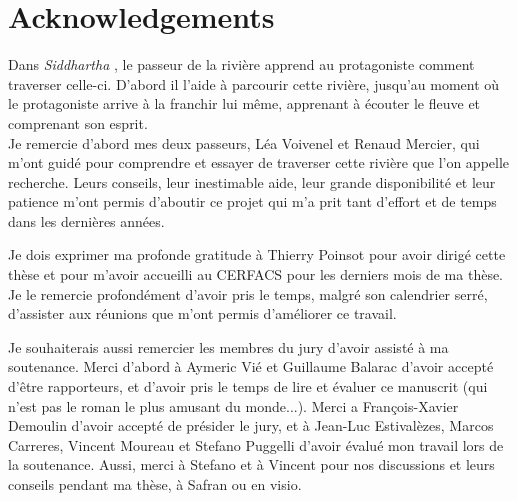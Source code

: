 \chapter*{Acknowledgements}
    
Dans \textsl{Siddhartha} , le passeur de la rivière apprend au protagoniste comment traverser celle-ci. D'abord il l'aide à parcourir cette rivière, jusqu'au moment où le protagoniste arrive à la franchir lui même, apprenant à écouter le fleuve et comprenant son esprit. \\  %
%
Je remercie d'abord mes deux passeurs, Léa Voivenel et Renaud Mercier, qui m'ont guidé pour comprendre et essayer de traverser cette rivière que l'on appelle recherche. Leurs conseils, leur inestimable aide, leur grande disponibilité et leur patience m'ont permis d'aboutir ce projet qui m'a prit tant d'effort et de temps dans les dernières années.

Je dois exprimer ma profonde gratitude à Thierry Poinsot pour avoir dirigé cette thèse et pour m'avoir accueilli au CERFACS pour les derniers mois de ma thèse. Je le remercie profondément d'avoir pris le temps, malgré son calendrier serré, d'assister aux réunions que m'ont permis d'améliorer ce travail.

Je souhaiterais aussi remercier les membres du jury d'avoir assisté à ma soutenance. Merci d'abord à Aymeric Vié et Guillaume Balarac d'avoir accepté d'être  rapporteurs, et d'avoir pris le temps de lire et évaluer ce manuscrit (qui n'est pas le roman le plus amusant du monde...).  Merci a François-Xavier Demoulin d'avoir accepté de présider le jury, et à Jean-Luc Estivalèzes, Marcos Carreres, Vincent Moureau et Stefano Puggelli d'avoir évalué  mon travail lors de la soutenance. Aussi, merci à Stefano et à Vincent pour nos discussions et leurs conseils pendant ma thèse, à Safran ou en visio. 

